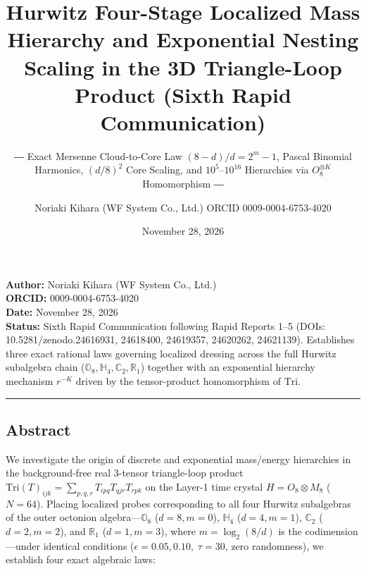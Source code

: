 \documentclass[
  a4paper,
]{article}
\title{Hurwitz Four-Stage Localized Mass Hierarchy and Exponential
Nesting Scaling in the 3D Triangle-Loop Product (Sixth Rapid
Communication)}
\subtitle{― Exact Mersenne Cloud-to-Core Law \((8-d)/d = 2^m - 1\),
Pascal Binomial Harmonics, \((d/8)^2\) Core Scaling, and
\(10^5\)--\(10^{16}\) Hierarchies via \(O_8^{\otimes K}\) Homomorphism
―}
\author{Noriaki Kihara (WF System Co., Ltd.) ORCID 0009-0004-6753-4020}
\date{November 28, 2026}
\begin{document}
\maketitle

\textbf{Author:} Noriaki Kihara (WF System Co., Ltd.)\\
\textbf{ORCID:} 0009-0004-6753-4020\\
\textbf{Date:} November 28, 2026\\
\textbf{Status:} Sixth Rapid Communication following Rapid Reports 1--5
(DOIs: 10.5281/zenodo.24616931, 24618400, 24619357, 24620262, 24621139).
Establishes three exact rational laws governing localized dressing
across the full Hurwitz subalgebra chain
(\(\mathbb{O}_8, \mathbb{H}_4, \mathbb{C}_2, \mathbb{R}_1\)) together
with an exponential hierarchy mechanism \(r^{-K}\) driven by the
tensor-product homomorphism of \(\mathrm{Tri}\).

\begin{center}\rule{0.5\linewidth}{0.5pt}\end{center}

\subsection{Abstract}\label{abstract}

We investigate the origin of discrete and exponential mass/energy
hierarchies in the background-free real 3-tensor triangle-loop product
\(\mathrm{Tri}(T)_{ijk} = \sum_{p,q,r} T_{ipq} T_{qjr} T_{rpk}\) on the
Layer-1 time crystal \(H = O_8 \otimes M_8\) (\(N = 64\)). Placing
localized probes corresponding to all four Hurwitz subalgebras of the
outer octonion algebra---\(\mathbb{O}_8\) (\(d=8, m=0\)),
\(\mathbb{H}_4\) (\(d=4, m=1\)), \(\mathbb{C}_2\) (\(d=2, m=2\)), and
\(\mathbb{R}_1\) (\(d=1, m=3\)), where \(m = \log_2(8/d)\) is the
codimension---under identical conditions
(\(\epsilon = 0.05, 0.10,\; \tau = 30\), zero randomness), we establish
four exact algebraic laws:
\end{document}
